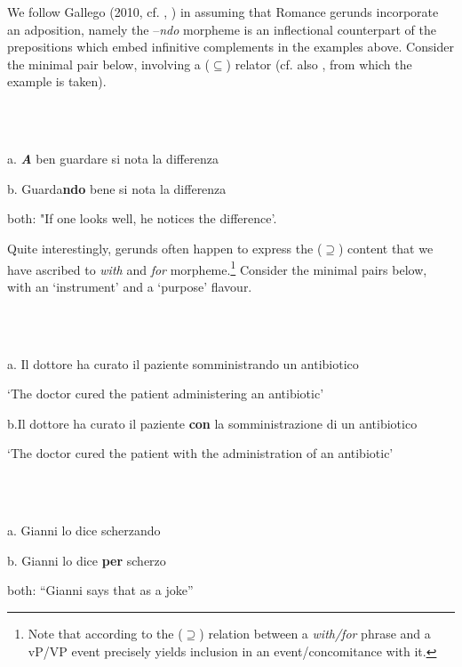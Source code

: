 \documentclass[output=paper,colorlinks,citecolor=brown]{./langscibook}
\begin{document}
We follow Gallego (2010, cf. \citealt{Mateu2002}, \citealt{Franco2015}) in assuming that Romance gerunds incorporate an adposition, namely the –\textit{ndo} morpheme is an inflectional counterpart of the prepositions which embed infinitive complements in the examples above. Consider the minimal pair below, involving a (${\subseteq}$) relator (cf. also \citealt{Casalicchio2013}, from which the example  is taken). 

\ea%
    \label{ex:key:27}
    \gll\\
        \\
    \glt
    \z

           a.  \textbf{\textit{A}} ben guardare si nota la differenza

b.  Guarda\textbf{ndo} bene si nota la differenza

both: "If one looks well, he notices the difference’.

Quite interestingly, gerunds often happen to express the (${\supseteq}$) content that we have ascribed to \textit{with} and \textit{for} morpheme.\footnote{Note that according to \citealt{FrancoManzini2017b} the (\textrm{${\supseteq}$}) relation between a \textit{with/for} phrase and a vP/VP event precisely yields inclusion in an event/concomitance with it.} Consider the minimal pairs below, with an ‘instrument’  and a ‘purpose’  flavour.

\ea%
    \label{ex:key:28}
    \gll\\
        \\
    \glt
    \z

           a. Il dottore ha curato il paziente somministrando un antibiotico

‘The doctor cured the patient administering an antibiotic’

b.Il dottore ha curato il paziente \textbf{con} la somministrazione di un antibiotico

‘The doctor cured the patient with the administration of an antibiotic’

\ea%
    \label{ex:key:29}
    \gll\\
        \\
    \glt
    \z

          a.  Gianni lo dice scherzando

b.  Gianni lo dice \textbf{per} scherzo

both: “Gianni says that as a joke”
\end{document}
